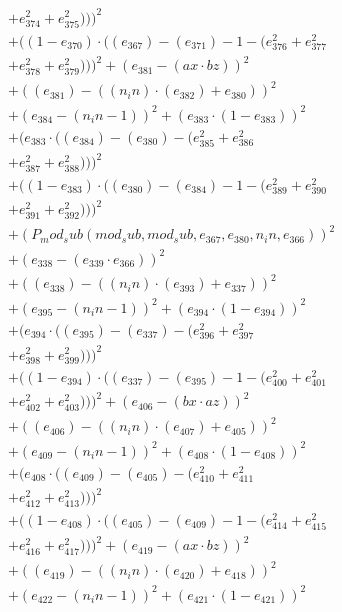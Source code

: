 \documentclass[10pt, a4paper]{article}
\begin{document}
\begin{align*}
& + e_{374}^{2} + e_{375}^{2})))^{2} \\
& + ((1 - e_{370})  \cdot  ((e_{367}) - (e_{371}) - 1 - (e_{376}^{2} + e_{377}^{2} \\
& + e_{378}^{2} + e_{379}^{2})))^{2} + (e_{381} - (ax  \cdot  bz))^{2} \\
& + ((e_{381}) - ((n_in)  \cdot  (e_{382}) + e_{380}))^{2} \\
& + (e_{384} - (n_in - 1))^{2} + (e_{383}  \cdot  (1 - e_{383}))^{2} \\
& + (e_{383}  \cdot  ((e_{384}) - (e_{380}) - (e_{385}^{2} + e_{386}^{2} \\
& + e_{387}^{2} + e_{388}^{2})))^{2} \\
& + ((1 - e_{383})  \cdot  ((e_{380}) - (e_{384}) - 1 - (e_{389}^{2} + e_{390}^{2} \\
& + e_{391}^{2} + e_{392}^{2})))^{2} \\
& + (P_mod_sub(mod_sub, mod_sub, e_{367}, e_{380}, n_in, e_{366}))^{2} \\
& + (e_{338} - (e_{339}  \cdot  e_{366}))^{2} \\
& + ((e_{338}) - ((n_in)  \cdot  (e_{393}) + e_{337}))^{2} \\
& + (e_{395} - (n_in - 1))^{2} + (e_{394}  \cdot  (1 - e_{394}))^{2} \\
& + (e_{394}  \cdot  ((e_{395}) - (e_{337}) - (e_{396}^{2} + e_{397}^{2} \\
& + e_{398}^{2} + e_{399}^{2})))^{2} \\
& + ((1 - e_{394})  \cdot  ((e_{337}) - (e_{395}) - 1 - (e_{400}^{2} + e_{401}^{2} \\
& + e_{402}^{2} + e_{403}^{2})))^{2} + (e_{406} - (bx  \cdot  az))^{2} \\
& + ((e_{406}) - ((n_in)  \cdot  (e_{407}) + e_{405}))^{2} \\
& + (e_{409} - (n_in - 1))^{2} + (e_{408}  \cdot  (1 - e_{408}))^{2} \\
& + (e_{408}  \cdot  ((e_{409}) - (e_{405}) - (e_{410}^{2} + e_{411}^{2} \\
& + e_{412}^{2} + e_{413}^{2})))^{2} \\
& + ((1 - e_{408})  \cdot  ((e_{405}) - (e_{409}) - 1 - (e_{414}^{2} + e_{415}^{2} \\
& + e_{416}^{2} + e_{417}^{2})))^{2} + (e_{419} - (ax  \cdot  bz))^{2} \\
& + ((e_{419}) - ((n_in)  \cdot  (e_{420}) + e_{418}))^{2} \\
& + (e_{422} - (n_in - 1))^{2} + (e_{421}  \cdot  (1 - e_{421}))^{2} \\

\end{align*}
\end{document}

